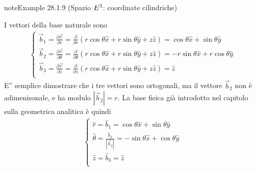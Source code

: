 \documentclass[letterpaper,10pt,italian]{jupyterBook}
\begin{document}
\begin{sphinxadmonition}{note}{Example 28.1.9 (Spazio \protect\(E^3\protect\): coordinate cilindriche)}



\sphinxAtStartPar
I vettori della base naturale sono
\begin{equation*}
\begin{split}\begin{cases}
  \vec{b}_1 = \frac{\partial \vec{r}}{\partial r     } = \frac{\partial }{\partial r     } \left( r \cos \theta \hat{x} + r \sin \theta \hat{y} + z \hat{z} \right) = \cos \theta \hat{x} + \sin \theta \hat{y} \\
  \vec{b}_2 = \frac{\partial \vec{r}}{\partial \theta} = \frac{\partial }{\partial \theta} \left( r \cos \theta \hat{x} + r \sin \theta \hat{y} + z \hat{z} \right) = -r\sin \theta \hat{x} + r \cos \theta\hat{y} \\
  \vec{b}_3 = \frac{\partial \vec{r}}{\partial z     } = \frac{\partial }{\partial z     } \left( r \cos \theta \hat{x} + r \sin \theta \hat{y} + z \hat{z} \right) = \hat{z} \\
\end{cases}\end{split}
\end{equation*}
\sphinxAtStartPar
E” semplice dimostrare che i tre vettori sono ortogonali, ma il vettore \(\vec{b}_2\) non è adimenisonale, e ha modulo \(|\vec{b}_2| = r\). La base fisica \sphinxhyphen{} già introdotto nel capitolo sulla geometrica analitica   \sphinxhyphen{} è quindi
\begin{equation*}
\begin{split}\begin{cases}
  \hat{r}      = \hat{b}_1 = \cos \theta \hat{x} + \sin \theta \hat{y} \\
  \hat{\theta} = \frac{\hat{b}_2}{|\vec{b}_2|} = - \sin \theta \hat{x} + \cos \theta \hat{y} \\
  \hat{z}      = \hat{b}_3 = \hat{z} \\
\end{cases}\end{split}
\end{equation*}\end{sphinxadmonition}
\label{ch/vector-calculus/geometry:example-12}
\end{document}
